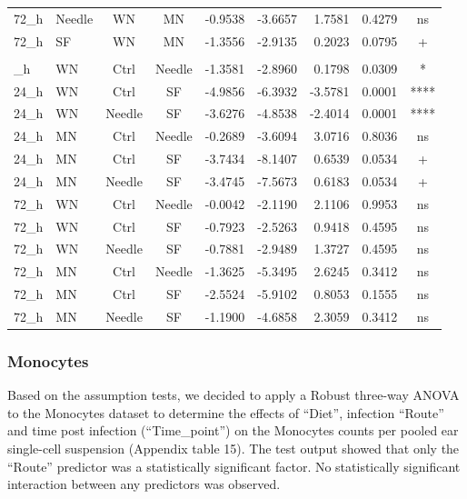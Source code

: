 \documentclass[
  12pt,
  letterpaper,
]{article}
\begin{document}
\begin{longtable}{llccrrrrc}
72\_h & Needle & WN & MN & -0.9538 & -3.6657 & 1.7581 & 0.4279 & ns \\ 
72\_h & SF & WN & MN & -1.3556 & -2.9135 & 0.2023 & 0.0795 & + \\ 
\midrule\addlinespace[2.5pt]
\multicolumn{9}{l}{Predictor: Route} \\[2.5pt] 
\midrule\addlinespace[2.5pt]
24\_h & WN & Ctrl & Needle & -1.3581 & -2.8960 & 0.1798 & 0.0309 & * \\ 
24\_h & WN & Ctrl & SF & -4.9856 & -6.3932 & -3.5781 & 0.0001 & **** \\ 
24\_h & WN & Needle & SF & -3.6276 & -4.8538 & -2.4014 & 0.0001 & **** \\ 
24\_h & MN & Ctrl & Needle & -0.2689 & -3.6094 & 3.0716 & 0.8036 & ns \\ 
24\_h & MN & Ctrl & SF & -3.7434 & -8.1407 & 0.6539 & 0.0534 & + \\ 
24\_h & MN & Needle & SF & -3.4745 & -7.5673 & 0.6183 & 0.0534 & + \\ 
72\_h & WN & Ctrl & Needle & -0.0042 & -2.1190 & 2.1106 & 0.9953 & ns \\ 
72\_h & WN & Ctrl & SF & -0.7923 & -2.5263 & 0.9418 & 0.4595 & ns \\ 
72\_h & WN & Needle & SF & -0.7881 & -2.9489 & 1.3727 & 0.4595 & ns \\ 
72\_h & MN & Ctrl & Needle & -1.3625 & -5.3495 & 2.6245 & 0.3412 & ns \\ 
72\_h & MN & Ctrl & SF & -2.5524 & -5.9102 & 0.8053 & 0.1555 & ns \\ 
72\_h & MN & Needle & SF & -1.1900 & -4.6858 & 2.3059 & 0.3412 & ns \\ 
\bottomrule
\end{longtable}
\endgroup

\subsubsection{Monocytes}\label{monocytes-1}

Based on the assumption tests, we decided to apply a Robust three-way ANOVA to the Monocytes dataset to determine the effects of ``Diet'', infection ``Route'' and time post infection (``Time\_point'') on the Monocytes counts per pooled ear single-cell suspension (Appendix table 15). The test output showed that only the ``Route'' predictor was a statistically significant factor. No statistically significant interaction between any predictors was observed.
\end{document}
